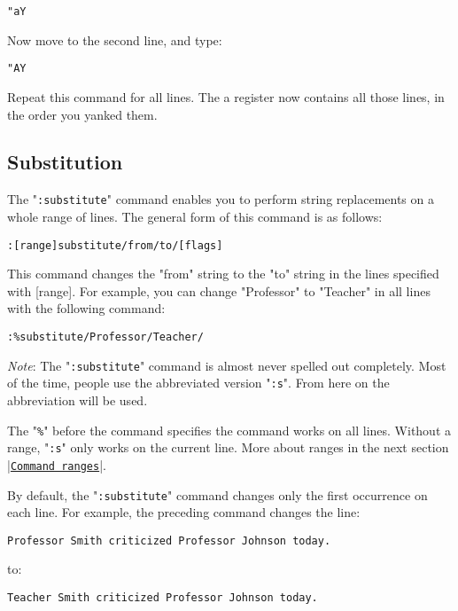 \begin{Verbatim}[samepage=true]
 "aY
\end{Verbatim}

Now move to the second line, and type:

\begin{Verbatim}[samepage=true]
 "AY
\end{Verbatim}

Repeat this command for all lines.
The a register now contains all those lines, in the order you yanked them.

\subsection{Substitution}
\label{find-replace}
The "\verb!:substitute!" command enables you to perform string replacements on a whole range of lines.
The general form of this command is as follows:

\begin{Verbatim}[samepage=true]
 :[range]substitute/from/to/[flags]
\end{Verbatim}

This command changes the "from" string to the "to" string in the lines specified with [range].
For example, you can change "Professor" to "Teacher" in all lines with the following command:

\begin{Verbatim}[samepage=true]
 :%substitute/Professor/Teacher/
\end{Verbatim}
 
\emph{Note}: The "\verb!:substitute!" command is almost never spelled out completely.
Most of the time, people use the abbreviated version "\verb!:s!".
From here on the abbreviation will be used.

The "\verb!%!" before the command specifies the command works on all lines.
Without a range, "\verb!:s!" only works on the current line.
More about ranges in the next section |\hyperref[Command ranges]{\texttt{Command ranges}}|.

By default, the "\verb!:substitute!" command changes only the first occurrence on each line.
For example, the preceding command changes the line:

\begin{Verbatim}[samepage=true]
    Professor Smith criticized Professor Johnson today. 
\end{Verbatim}

to:

\begin{Verbatim}[samepage=true]
    Teacher Smith criticized Professor Johnson today. 
\end{Verbatim}

